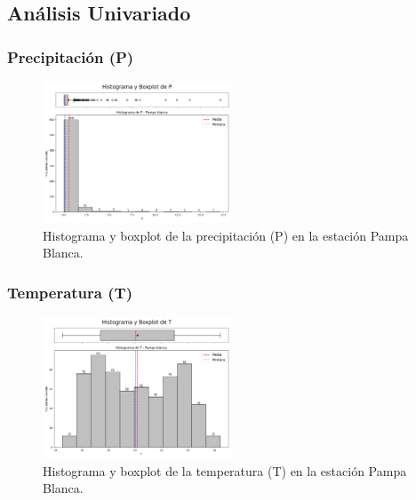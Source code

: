 \subsection{Análisis Univariado}

\subsubsection*{Precipitación (P)}
\begin{figure}[H]
\centering
\includegraphics[width=0.5\textwidth]{resultados/por_estacion_meteorologica/Pampa_Blanca/P_histograma.png}
\caption{Histograma y boxplot de la precipitación (P) en la estación Pampa Blanca.}
\label{fig:pampablanca_P}
\end{figure}

\subsubsection*{Temperatura (T)}
\begin{figure}[H]
\centering
\includegraphics[width=0.5\textwidth]{resultados/por_estacion_meteorologica/Pampa_Blanca/T_histograma.png}
\caption{Histograma y boxplot de la temperatura (T) en la estación Pampa Blanca.}
\label{fig:pampablanca_T}
\end{figure}

